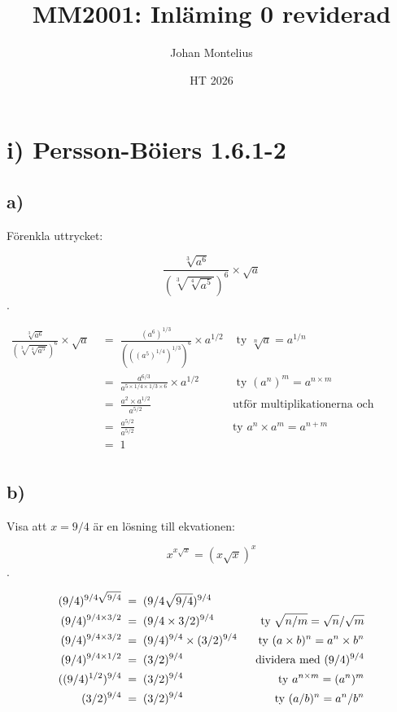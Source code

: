 \documentclass[a4paper, 11pt]{article}
\begin{document}
\title{
    \textbf{MM2001: Inläming 0 reviderad}
}
\author{Johan Montelius}
\date{HT 2026}

\maketitle



\section*{i)  Persson-Böiers 1.6.1-2}

\subsection*{a)}

Förenkla uttrycket:

$$ \frac{\sqrt[3]{ a^6}}{(\sqrt[3]{\sqrt[4]{a^5}})^6} \times \sqrt{a}$$.


\begin{align*}
  \frac{\sqrt[3]{ a^6}}{(\sqrt[3]{\sqrt[4]{a^5}})^6} \times \sqrt{a} 
  &\;=\; \frac{(a^6)^{1/3}}{(((a^5)^{1/4})^{1/3})^6} \times a^{1/2} & \text{ ty\ } \sqrt[n]{a} = a^{1/n}\\
  &\;=\; \frac{a^{6/3}}{a^{5\times {1/4} \times {1/3} \times 6}} \times a^{1/2} & \text{ ty\ } (a^n)^m = a^{n\times m}\\
  &\;=\; \frac{a^{2} \times a^{1/2} }{a^{5 / 2}}  & \text{utför multiplikationerna och förenklar}\\
  &\;=\; \frac{a^{5/2}}{a^{5/2}}  & \text{ty\ } a^n \times a^m = a^{n +  m} \\
  &\;=\; 1  &  \\
\end{align*}
  

\subsection*{b)}

Visa att $x = 9/4$ är en lösning till ekvationen:

$$x^{x \sqrt{x}} = (x\sqrt{x})^x$$.

\begin{align*}
  (9/4)^{9/4 \sqrt{9/4}}   &\; =\;   (9/4\sqrt{9/4})^{9/4}  & \\
  (9/4)^{9/4 \times 3/2}  &\; =\;   (9/4\times 3/2)^{9/4}  &\; \text{ ty\;} \sqrt{n/m} = \sqrt{n}/\sqrt{m}\\
  (9/4)^{9/4 \times 3/2}  &\; =\;  (9/4)^{9/4} \times  (3/2)^{9/4}   &\; \text{ ty\ } (a \times b)^n = a^n \times b^n\\
  (9/4)^{9/4 \times 1/2}  &\; =\;   (3/2)^{9/4}   &\; \text{ dividera med\ } (9/4)^{9/4}\\
  ((9/4)^{1/2})^{9/4} &\; =\;   (3/2)^{9/4}   &\; \text{ ty\ } a^{n\times m} = (a^n)^m\\
  (3/2)^{9/4} &\; =\;   (3/2)^{9/4}   &\; \text{ ty\ } (a/b)^n = a^n/b^n \\
  \end{align*}
\end{document}
